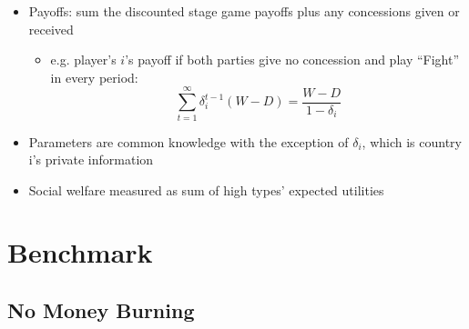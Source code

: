 \documentclass{beamer}
\newcommand{\de}{\delta}
\begin{document}

\begin{frame}
\begin{itemize}[<+->]
	\item Payoffs: sum the discounted stage game payoffs plus any concessions given or received
		\begin{itemize}
			\item e.g. player's $i$'s payoff if both parties give no concession and play ``Fight'' in every period: $$\sum_{t=1}^\infty \de_i^{t-1} (W-D) = \frac{W-D}{1-\de_i}$$
		\end{itemize}
	\item Parameters are common knowledge with the exception of $\delta_i$, which is country i's private information
	\item Social welfare measured as sum of high types' expected utilities
\end{itemize}
\end{frame}


\section{Benchmark}
\subsection{No Money Burning}
\end{document}
